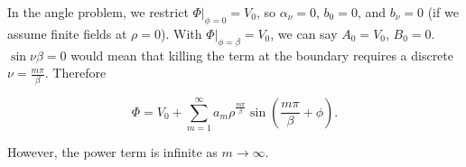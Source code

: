 \documentclass[a4paper,twoside,master.tex]{subfiles}
\begin{document}
In the angle problem, we restrict $\Phi\bigg|_{\phi=0} = V_0$, so $\alpha_\nu = 0$, $b_0 = 0$, and $b_\nu = 0$ (if we assume finite fields at $\rho=0$). With $\Phi\bigg|_{\phi = \beta} = V_0$, we can say $A_0 = V_0$, $B_0=0$. $\sin\nu\beta = 0$ would mean that killing the term at the boundary requires a discrete $\nu = \frac{m\pi}{\beta}$. Therefore

\begin{equation}
   \Phi = V_0+\sum_{m=1}^\infty a_m\rho^{\frac{m\pi}{\beta}}\sin\left(\frac{m\pi}{\beta}+\phi\right).
\end{equation}

However, the power term is infinite as $m\to\infty$.
\end{document}
